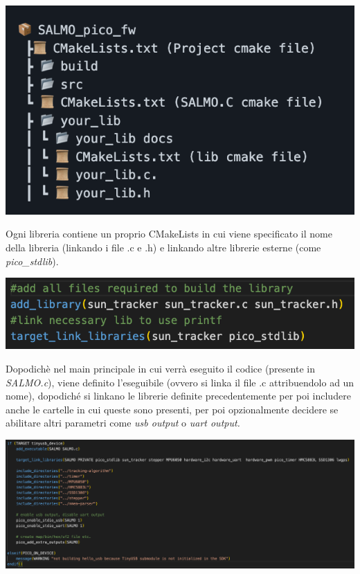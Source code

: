 \begin{center}
\includegraphics[scale=1]{figures/image73.png}
\captionsetup{type=figure}
\end{center}

\noindent Ogni libreria contiene un proprio CMakeLists in cui viene specificato il
nome della libreria (linkando i file .c e .h) e linkando altre librerie
esterne (come \emph{pico\_stdlib}).

\begin{center}
\includegraphics[scale=1]{figures/image45.png}
\captionsetup{type=figure}
\end{center}

\noindent Dopodichè nel main principale in cui verrà eseguito il codice (presente
in \emph{SALMO.c}), viene definito l'eseguibile (ovvero si linka il file
.c attribuendolo ad un nome), dopodiché si linkano le librerie definite
precedentemente per poi includere anche le cartelle in cui queste sono
presenti, per poi opzionalmente decidere se abilitare altri parametri
come \emph{usb output} o \emph{uart output.}

\begin{center}
\includegraphics[scale=0.45]{figures/image66.png}
\captionsetup{type=figure}
\end{center}

